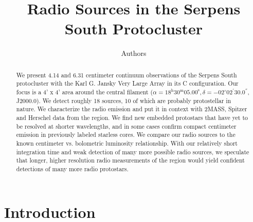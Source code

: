 \documentclass[apj]{emulateapj}
\begin{document}
\title{Radio Sources in the Serpens South Protocluster}
\author{Authors}

\begin{abstract}

We present 4.14 and 6.31 centimeter continuum observations of the Serpens South protocluster with the Karl G. Jansky Very Large Array in its C configuration. Our focus is a 4' x 4' area around the central filament ($\alpha=18^{\text{h}}30^{\text{m}}05.00^{\text{s}}, \delta=-02^{\circ}02^{'}30.0^{''}$, J2000.0). We detect roughly 18 sources, 10 of which are probably protostellar in nature. We characterize the radio emission and put it in context with 2MASS, Spitzer and Herschel data from the region. We find new embedded protostars that have yet to be resolved at shorter wavelengths, and in some cases confirm compact centimeter emission in previously labeled starless cores. We compare our radio sources to the known centimeter vs. bolometric luminosity relationship. With our relatively short integration time and weak detection of many more possible radio sources, we speculate that longer, higher resolution radio measurements of the region would yield confident detections of many more radio protostars. 

\end{abstract}

\maketitle
\newpage


\section{Introduction}
\label{sec:introduction}
\end{document}
